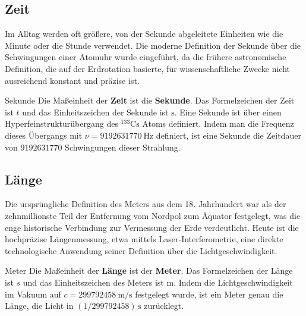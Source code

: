 \subsection{Zeit}\label{subsec: SI-Zeit}
Im Alltag werden oft größere, von der Sekunde abgeleitete Einheiten wie die Minute oder die Stunde verwendet. Die moderne Definition der Sekunde über die Schwingungen einer Atomuhr wurde eingeführt, da die frühere astronomische Definition, die auf der Erdrotation basierte, für wissenschaftliche Zwecke nicht ausreichend konstant und präzise ist.
\begin{importantbox}[]{Sekunde}
Die Maßeinheit der \textbf{Zeit} ist die \textbf{Sekunde}. Das Formelzeichen der Zeit ist $t$ und das Einheitszeichen der Sekunde ist $\si{\second}$. 
\tcblower
Eine Sekunde ist über einen Hyperfeinstrukturübergang\footnotemark{} des $^{133}\text{Cs}$ Atoms definiert. Indem man die Frequenz dieses Übergangs mit $\nu = \SI{9 192 631 770}{\hertz}$ definiert, ist eine Sekunde die Zeitdauer von $\num{9 192 631 770}$ Schwingungen dieser Strahlung.  
\end{importantbox}

\subsection{Länge}\label{subsec: SI-Länge}
Die ursprüngliche Definition des Meters aus dem 18. Jahrhundert war als der zehnmillionste Teil der Entfernung vom Nordpol zum Äquator festgelegt, was die enge historische Verbindung zur Vermessung der Erde verdeutlicht. Heute ist die hochpräzise Längenmessung, etwa mittels Laser-Interferometrie, eine direkte technologische Anwendung seiner Definition über die Lichtgeschwindigkeit.
\begin{importantbox}[]{Meter}
Die Maßeinheit der \textbf{Länge} ist der \textbf{Meter}. Das Formelzeichen der Länge ist $s$ und das Einheitszeichen des Meters ist $\si{\meter}$. 
\tcblower
Indem die Lichtgeschwindigkeit im Vakuum auf $c = \SI{299 792 458}{\meter\per\second}$ festgelegt wurde\footnotemark{}, ist ein Meter genau die Länge, die Licht in $(1/\num{299 792 458})\,\si{\second}$ zurücklegt.
\end{importantbox}

